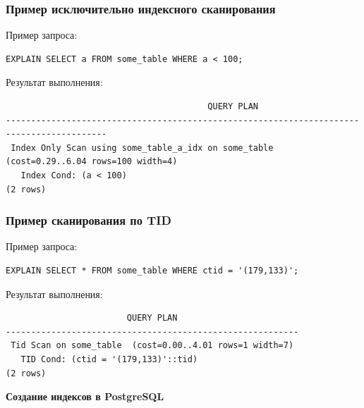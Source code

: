 \documentclass[aspectratio=169]{beamer}
\begin{document}
\begin{frame}[fragile]
  \frametitle{Пример исключительно индексного сканирования}

  Пример запроса:
  \begin{verbatim}
EXPLAIN SELECT a FROM some_table WHERE a < 100;
  \end{verbatim}

  \vspace*{1em}

  Результат выполнения:
  \begin{verbatim}
                                        QUERY PLAN
------------------------------------------------------------------------------------------
 Index Only Scan using some_table_a_idx on some_table  (cost=0.29..6.04 rows=100 width=4)
   Index Cond: (a < 100)
(2 rows)
  \end{verbatim}
\end{frame}

\begin{frame}[fragile]
  \frametitle{Пример сканирования по TID}

  Пример запроса:
  \begin{verbatim}
EXPLAIN SELECT * FROM some_table WHERE ctid = '(179,133)';
  \end{verbatim}

  \vspace*{1em}

  Результат выполнения:
  \begin{verbatim}
                        QUERY PLAN
----------------------------------------------------------
 Tid Scan on some_table  (cost=0.00..4.01 rows=1 width=7)
   TID Cond: (ctid = '(179,133)'::tid)
(2 rows)
  \end{verbatim}
\end{frame}

\begin{frame}
  \vspace*{1em}
  \begin{center}
    {\huge \textbf{Создание индексов в PostgreSQL}}
  \end{center}
\end{frame}
\end{document}
